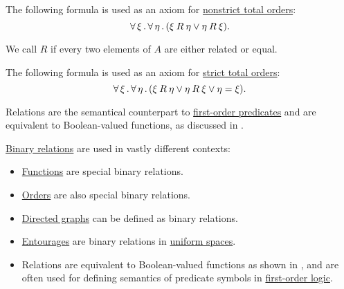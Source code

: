 \begin{definition}
\begin{thmenum}[resume=def:binary_relation]
    The following formula is used as an axiom for \hyperref[def:totally_ordered_set]{nonstrict total orders}:
    \begin{equation}\label{eq:def:binary_relation/connected}
      \forall \thinspace \xi \thinspace . \thinspace \forall \thinspace \eta \thinspace . \thinspace (\xi \mathbin{R} \eta \vee \eta \mathbin{R} \xi).
    \end{equation}

     We call \( R \)  if every two elements of \( A \) are either related or equal.

    The following formula is used as an axiom for \hyperref[def:totally_ordered_set]{strict total orders}:
    \begin{equation}\label{eq:def:binary_relation/trichotomic}
      \forall \thinspace \xi \thinspace . \thinspace \forall \thinspace \eta \thinspace . \thinspace (\xi \mathbin{R} \eta \vee \eta \mathbin{R} \xi \vee \eta = \xi).
    \end{equation}
  \end{thmenum}
\end{definition}
\begin{comments}
  \item Relations are the semantical counterpart to \hyperref[def:first_order_structure/interpretation/predicate]{first-order predicates} and are equivalent to Boolean-valued functions, as discussed in .
\end{comments}

\begin{example}\label{ex:def:binary_relation}
  \hyperref[def:binary_relation]{Binary relations} are used in vastly different contexts:
  \begin{itemize}
    \item \hyperref[def:function]{Functions} are special binary relations.
    \item \hyperref[sec:order_theory]{Orders} are also special binary relations.
    \item \hyperref[def:directed_graph]{Directed graphs} can be defined as binary relations.
    \item \hyperref[def:entourage]{Entourages} are binary relations in \hyperref[def:uniform_space]{uniform spaces}.
    \item Relations are equivalent to Boolean-valued functions as shown in , and are often used for defining semantics of predicate symbols in \hyperref[subsec:first_order_logic]{first-order logic}.
  \end{itemize}
\end{example}

